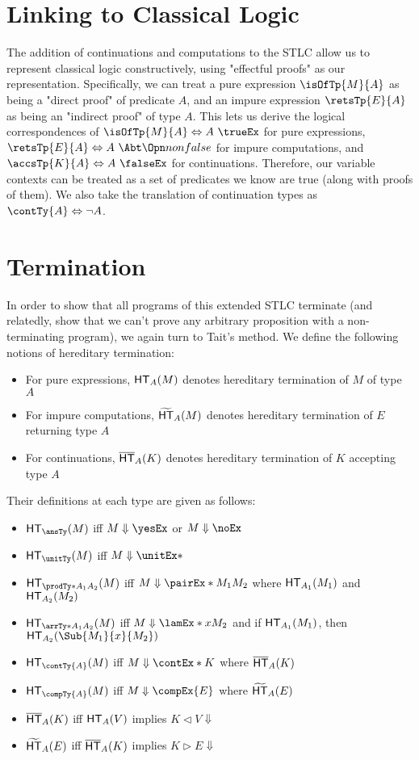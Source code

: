 \documentclass[letterpaper]{article}
\begin{document}
\section{Linking to Classical Logic}

The addition of continuations and computations to the STLC allow us to represent classical logic constructively, using "effectful proofs" as our representation.
Specifically, we can treat a pure expression $\isOfTp{M}{A}$ as being a "direct proof" of predicate $A$, and an impure expression $\retsTp{E}{A}$ as being an "indirect proof" of type $A$.
This lets us derive the logical correspondences of $\isOfTp{M}{A} \Leftrightarrow A\ \trueEx$ for pure expressions, $\retsTp{E}{A} \Leftrightarrow A\ \nonfalseEx$ for impure computations, and $\accsTp{K}{A} \Leftrightarrow A\ \falseEx$ for continuations.
Therefore, our variable contexts can be treated as a set of predicates we know are true (along with proofs of them).
We also take the translation of continuation types as $\contTy{A} \Leftrightarrow \neg A$.

\section{Termination}

In order to show that all programs of this extended STLC terminate (and relatedly, show that we can't prove any arbitrary proposition with a non-terminating program), we again turn to Tait's method.
We define the following notions of hereditary termination:
\begin{itemize}
  \item For pure expressions, $\HT[A](M)$ denotes hereditary termination of $M$ of type $A$
  \item For impure computations, $\HTe[A](M)$ denotes hereditary termination of $E$ returning type $A$
  \item For continuations, $\HTk[A](K)$ denotes hereditary termination of $K$ accepting type $A$
\end{itemize}

Their definitions at each type are given as follows:

\begin{itemize}
  \item $\HT[\ansTy](M)$ iff $M \Downarrow \yesEx$ or $M \Downarrow \noEx$
  \item $\HT[\unitTy](M)$ iff $M \Downarrow \unitEx*$
  \item $\HT[\prodTy*{A_1}{A_2}](M)$ iff $M \Downarrow \pairEx*{M_1}{M_2}$ where $\HT[A_1](M_1)$ and $\HT[A_2](M_2)$
  \item $\HT[\arrTy*{A_1}{A_2}](M)$ iff $M \Downarrow \lamEx*{x}{M_2}$ and if $\HT[A_1](M_1)$, then $\HT[A_2](\Sub{M_1}{x}{M_2})$
  \item $\HT[\contTy{A}](M)$ iff $M \Downarrow \contEx*{K}$ where $\HTk[A](K)$
  \item $\HT[\compTy{A}](M)$ iff $M \Downarrow \compEx{E}$ where $\HTe[A](E)$
  \item $\HTk[A](K)$ iff $\HT[A](V)$ implies $K \vartriangleleft V \Downarrow$
  \item $\HTe[A](E)$ iff $\HTk[A](K)$ implies $K \vartriangleright E \Downarrow$
\end{itemize}
\end{document}
